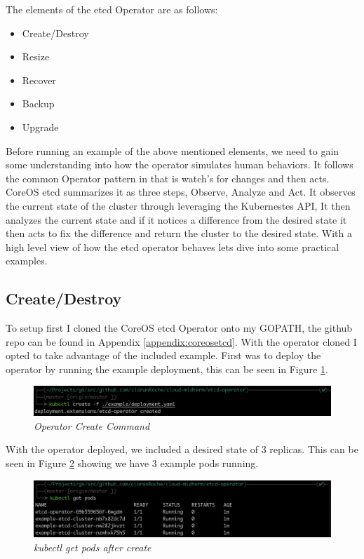 The elements of the etcd Operator are as follows:
\begin{itemize}
    \item Create/Destroy
    \item Resize
    \item Recover
    \item Backup
    \item Upgrade
\end{itemize}

Before running an example of the above mentioned elements, we need to gain some understanding into how the operator simulates human behaviors. It follows the common Operator pattern in that is watch's for changes and then acts. CoreOS etcd summarizes it as three steps, Observe, Analyze and Act. It observes the current state of the cluster through leveraging the Kubernestes API, It then analyzes the current state and if it notices a difference from the desired state it then acts to fix the difference and return the cluster to the desired state. With a high level view of how the etcd operator behaves lets dive into some practical examples.

\subsection{Create/Destroy}
To setup first I cloned the CoreOS etcd Operator onto my GOPATH, the github repo can be found in Appendix \ref{appendix:coreosetcd}. With the operator cloned I opted to take advantage of the included example. First was to deploy the operator by running the example deployment, this can be seen in Figure \ref{img:op_2}.
\begin{figure}[!ht]
\centering
\includegraphics*[width=1\textwidth]{images/op2.png}
\caption{\em Operator Create Command}
\label{img:op_2}
\end{figure}

With the operator deployed, we included a desired state of 3 replicas. This can be seen in Figure \ref{img:op_3} showing we have 3 example pods running.
\begin{figure}[!ht]
\centering
\includegraphics*[width=1\textwidth]{images/op3.png}
\caption{\em kubectl get pods after create}
\label{img:op_3}
\end{figure}

